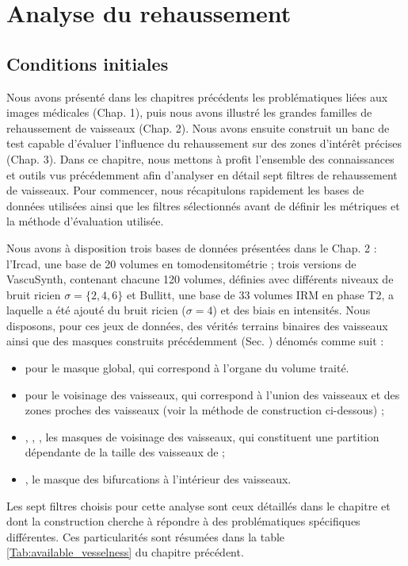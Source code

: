 \chapter{Analyse du rehaussement}
\label{sec:Analysis}
\section{Conditions initiales}
Nous avons présenté dans les chapitres précédents les problématiques liées aux images médicales (Chap. 1), puis nous avons illustré les grandes familles de rehaussement de vaisseaux (Chap. 2). Nous avons ensuite construit un banc de test capable d'évaluer l'influence du rehaussement sur des zones d'intérêt précises (Chap. 3). Dans ce chapitre, nous mettons à profit l'ensemble des connaissances et outils vus précédemment afin d'analyser en détail sept filtres de rehaussement de vaisseaux. Pour commencer, nous récapitulons rapidement les bases de données utilisées ainsi que les filtres sélectionnés avant de définir les métriques et la méthode d'évaluation utilisée.

Nous avons à disposition trois bases de données présentées dans le Chap. 2 : l'Ircad, une base de 20 volumes en tomodensitométrie ; trois versions de VascuSynth, contenant chacune 120 volumes, définies avec différents niveaux de bruit ricien $\sigma=\{2,4,6\}$ et Bullitt, une base de 33 volumes IRM en phase T2, a laquelle a été ajouté du bruit ricien ($\sigma=4$) et des biais en intensités. Nous disposons, pour ces jeux de données, des vérités terrains binaires des vaisseaux ainsi que des masques construits précédemment (Sec. \label{sec:evaluation}) dénomés comme suit :

\begin{itemize}
  \item \maskglobal pour le masque global, qui correspond à l'organe du volume traité.
  \item \maskvascular pour le voisinage des vaisseaux, qui correspond à l'union des vaisseaux et des zones proches des vaisseaux (voir la méthode de construction ci-dessous) ;
  \item \maskvesselLarge, \maskvesselMedium, \maskvesselSmall, les masques de voisinage des vaisseaux, qui constituent une partition dépendante de la taille des vaisseaux de \maskvascular;
  \item \maskbif, le masque des bifurcations à l'intérieur des vaisseaux.
  \end{itemize}

Les sept filtres choisis pour cette analyse sont ceux détaillés dans le chapitre \chapSOTAN{} et dont la construction cherche à répondre à des problématiques spécifiques différentes. Ces particularités sont résumées dans la table \ref{Tab:available_vesselness} du chapitre précédent. 

